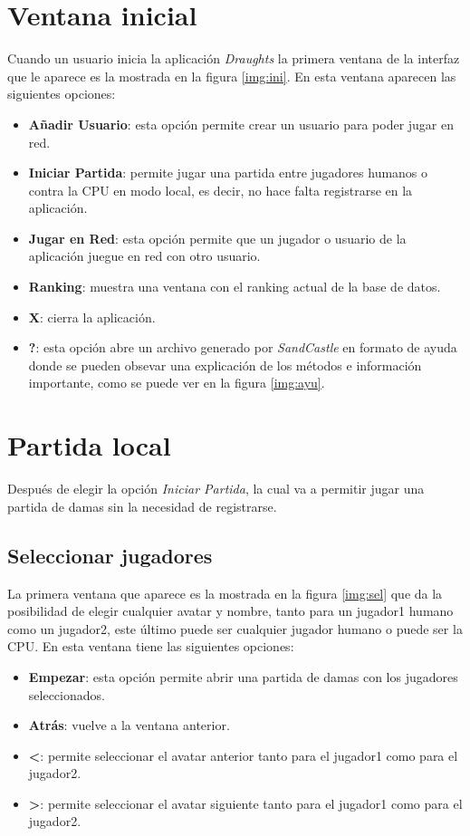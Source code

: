 \section{Ventana inicial}
Cuando un usuario inicia la aplicación \emph{Draughts} la primera ventana de la
 interfaz que le aparece es la mostrada en la figura \ref{img:ini}. En esta 
ventana aparecen las siguientes opciones:
\begin{itemize}
\item \textbf{Añadir Usuario}: esta opción permite crear un usuario para poder 
jugar en red.
\item \textbf{Iniciar Partida}: permite jugar una partida entre jugadores 
humanos o contra la CPU en modo local, es decir, no hace falta registrarse en 
la aplicación.
\item \textbf{Jugar en Red}: esta opción permite que un jugador o usuario de la 
aplicación juegue en red con otro usuario.
\item \textbf{Ranking}: muestra una ventana con el ranking actual de la base de
 datos.
\item \textbf{X}: cierra la aplicación.
\item \textbf{?}: esta opción abre un archivo generado por \emph{SandCastle} en
 formato de ayuda donde se pueden obsevar una explicación de los métodos e 
información importante, como se puede ver en la figura \ref{img:ayu}.
\end{itemize}


\section{Partida local}
Después de elegir la opción \emph{Iniciar Partida}, la cual va a permitir jugar
 una partida de damas sin la necesidad de registrarse.
\subsection{Seleccionar jugadores}
La primera ventana que aparece es la mostrada en la figura \ref{img:sel} que da
la posibilidad de elegir cualquier avatar y nombre, tanto para un jugador1 
humano como un jugador2, este último puede ser cualquier jugador humano o puede
ser la CPU. En esta ventana tiene las siguientes opciones:
\begin{itemize}
\item \textbf{Empezar}: esta opción permite abrir una partida de damas con los 
jugadores seleccionados.
\item \textbf{Atrás}: vuelve a la ventana anterior.
\item \textbf{<}: permite seleccionar el avatar anterior tanto para el jugador1
 como para el jugador2.
\item \textbf{>}: permite seleccionar el avatar siguiente tanto para el 
jugador1 como para el jugador2.
\end{itemize}

